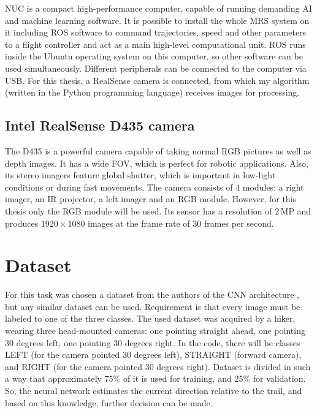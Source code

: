NUC is a compact high-performance computer, capable of running demanding AI and machine learning software. It is possible to install the whole \acs{MRS} system on it including \acs{ROS} software to command trajectories, speed and other parameters to a flight controller and act as a main high-level computational unit. \acs{ROS} runs inside the Ubuntu operating system on this computer, so other software can be used simultaneously. Different peripherals can be connected to the computer via \acs{USB}. For this thesis, a RealSense camera is connected, from which my algorithm (written in the Python programming language) receives images for processing.

\subsection{Intel RealSense D435 camera}

The D435 is a powerful camera capable of taking normal \acs{RGB} pictures as well as depth images. It has a wide \acs{FOV}, which is perfect for robotic applications. Also, its stereo imagers feature global shutter, which is important in low-light conditions or during fast movements. The camera consists of 4 modules: a right imager, an \acs{IR} projector, a left imager and an \acs{RGB} module. However, for this thesis only the \acs{RGB} module will be used. Its sensor has a resolution of 2\,MP and produces $1920\times1080$ images at the frame rate of 30 frames per second.


\section{Dataset}

For this task was chosen a dataset from the authors of the \acs{CNN} architecture \cite{giusti2016machine}, but any similar dataset can be used. Requirement is that every image must be labeled to one of the three classes. The used dataset was acquired by a hiker, wearing three head-mounted cameras: one pointing straight ahead, one pointing 30 degrees left, one pointing 30 degrees right. In the code, there will be classes LEFT (for the camera pointed 30 degrees left), STRAIGHT (forward camera), and RIGHT (for the camera pointed 30 degrees right). Dataset is divided in such a way that approximately 75\% of it is used for training, and 25\% for validation. So, the neural network estimates the current direction relative to the trail, and based on this knowledge, further decision can be made.


